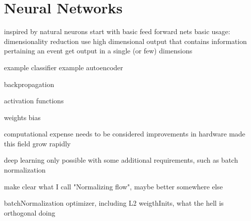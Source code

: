 \section{Neural Networks}
\label{sec:neurals}
inspired by natural neurons
start with basic feed forward nets
basic usage: dimensionality reduction
	use high dimensional output that contains information pertaining an event
	get output in a single (or few) dimensions
	
example classifier
example autoencoder

backpropagation

activation functions

weights
bias

computational expense needs to be considered
improvements in hardware made this field grow rapidly 

deep learning only possible with some additional requirements, such as batch normalization

make clear what I call "Normalizing flow", maybe better somewhere else

batchNormalization
optimizer, including L2
weigthInits, what the hell is orthogonal doing



